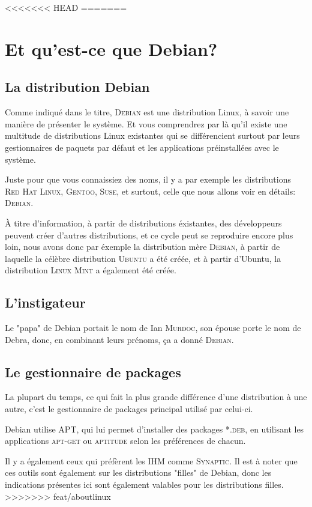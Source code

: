 <<<<<<< HEAD
=======
\chapter{Et qu'est-ce que Debian?}

\section{La distribution Debian}

Comme indiqué dans le titre, \textsc{Debian} est une distribution Linux, à savoir
une manière de présenter le système. Et vous comprendrez par là qu'il existe
une multitude de distributions Linux existantes qui se différencient surtout
par leurs gestionnaires de paquets par défaut et les applications préinstallées
avec le système.

Juste pour que vous connaissiez des noms, il y a par exemple les distributions
\textsc{Red Hat Linux}, \textsc{Gentoo}, \textsc{Suse}, et surtout, celle que
nous allons voir en détails: \textsc{Debian}.

À titre d'information, à partir de distributions éxistantes, des développeurs
peuvent créer d'autres distributions, et ce cycle peut se reproduire encore
plus loin, nous avons donc par éxemple la distribution mère \textsc{Debian},
à partir de laquelle la célèbre distribution \textsc{Ubuntu} a été créée, et
à partir d'Ubuntu, la distribution \textsc{Linux Mint} a également été créée.

\section{L'instigateur}

Le "papa" de Debian portait le nom de Ian \textsc{Murdoc}, son épouse porte le nom
de Debra, donc, en combinant leurs prénoms, ça a donné \textsc{Debian}.

\section{Le gestionnaire de packages}

La plupart du temps, ce qui fait la plus grande différence d'une distribution à
une autre, c'est le gestionnaire de packages principal utilisé par celui-ci.

Debian utilise \textsc{APT}, qui lui permet d'installer des packages \textsc{*.deb},
en utilisant les applications \textsc{apt-get} ou \textsc{aptitude} selon les
préférences de chacun.

Il y a également ceux qui préfèrent les IHM comme \textsc{Synaptic}. Il est à noter
que ces outils sont également sur les distributions "filles" de Debian, donc les
indications présentes ici sont également valables pour les distributions filles.
>>>>>>> feat/aboutlinux
